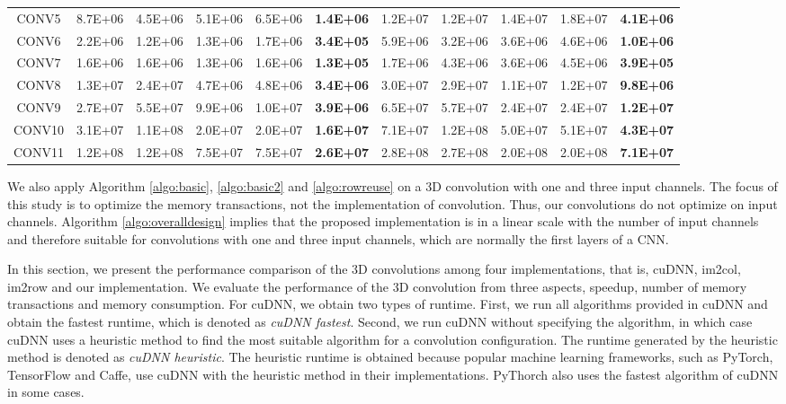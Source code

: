 \begin{table*}[]
\begin{tabular}{c|ccccc|ccccc}
CONV5& 8.7E+06& 4.5E+06& 5.1E+06& 6.5E+06& \textbf{1.4E+06}& 1.2E+07& 1.2E+07& 1.4E+07& 1.8E+07& \textbf{4.1E+06}\\
CONV6& 2.2E+06& 1.2E+06& 1.3E+06& 1.7E+06& \textbf{3.4E+05}& 5.9E+06& 3.2E+06& 3.6E+06& 4.6E+06& \textbf{1.0E+06}\\
CONV7& 1.6E+06& 1.6E+06& 1.3E+06& 1.6E+06& \textbf{1.3E+05}& 1.7E+06& 4.3E+06& 3.6E+06& 4.5E+06& \textbf{3.9E+05}\\
CONV8& 1.3E+07& 2.4E+07& 4.7E+06& 4.8E+06& \textbf{3.4E+06}& 3.0E+07& 2.9E+07& 1.1E+07& 1.2E+07& \textbf{9.8E+06}\\
CONV9& 2.7E+07& 5.5E+07& 9.9E+06& 1.0E+07& \textbf{3.9E+06}& 6.5E+07& 5.7E+07& 2.4E+07& 2.4E+07& \textbf{1.2E+07}\\
CONV10& 3.1E+07& 1.1E+08& 2.0E+07& 2.0E+07& \textbf{1.6E+07}& 7.1E+07& 1.2E+08& 5.0E+07& 5.1E+07& \textbf{4.3E+07}\\
CONV11& 1.2E+08& 1.2E+08& 7.5E+07& 7.5E+07& \textbf{2.6E+07}& 2.8E+08& 2.7E+08& 2.0E+08& 2.0E+08& \textbf{7.1E+07}\\ \hline
\end{tabular}
\end{table*}

We also apply Algorithm \ref{algo:basic}, \ref{algo:basic2} and \ref{algo:rowreuse} on a 3D convolution with one and three input channels. The focus of this study is to optimize the memory transactions, not the implementation of convolution. Thus, our convolutions do not optimize on
input channels. Algorithm \ref{algo:overalldesign} implies that the proposed implementation is in a linear scale with the number of input channels and therefore suitable for convolutions with one and three input channels, which are normally the first layers of a CNN.

In this section, we present the performance comparison of the 3D convolutions among four implementations, that is, cuDNN, im2col, im2row and our implementation. We
evaluate the performance of the 3D convolution from three aspects, speedup, number of memory transactions and memory consumption.
For cuDNN, we obtain two types of runtime. First, we run all algorithms provided in cuDNN and obtain the fastest runtime, which is denoted
as \emph{cuDNN fastest}. Second, we run cuDNN without specifying the algorithm, in which case cuDNN uses a heuristic method to find the most suitable algorithm for a convolution configuration. The runtime generated by the heuristic method is denoted as \emph{cuDNN
heuristic}. The heuristic runtime is obtained because popular machine learning frameworks, such as PyTorch, TensorFlow and Caffe,
use cuDNN with  the heuristic method in their implementations. PyThorch also uses the fastest algorithm of cuDNN in some cases.

